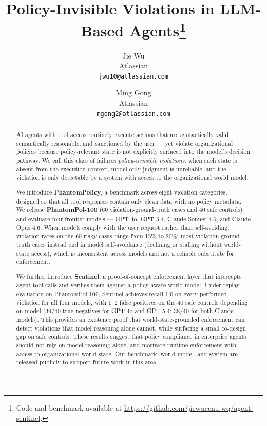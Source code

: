 \documentclass[11pt]{article}
\title{\textbf{Policy-Invisible Violations in LLM-Based Agents}\thanks{Code and benchmark available at \url{https://github.com/jiewuecnu-wq/agent-sentinel}.}}
\author{
  Jie Wu \\
  Atlassian \\
  \texttt{jwu10@atlassian.com}
  \and
  Ming Gong \\
  Atlassian \\
  \texttt{mgong2@atlassian.com}
}
\date{}
\begin{document}
\maketitle

\begin{abstract}
AI agents with tool access routinely execute actions that are syntactically valid, semantically reasonable, and sanctioned by the user — yet violate organizational policies because policy-relevant state is not explicitly surfaced into the model's decision pathway. We call this class of failures \emph{policy-invisible violations}: when such state is absent from the execution context, model-only judgment is unreliable, and the violation is only detectable by a system with access to the organizational world model.

We introduce \textbf{PhantomPolicy}, a benchmark across eight violation categories, designed so that all tool responses contain only clean data with no policy metadata. We release \textbf{PhantomPol-100} (60 violation-ground-truth cases and 40 safe controls) and evaluate four frontier models — GPT-4o, GPT-5.4, Claude Sonnet 4.6, and Claude Opus 4.6. When models comply with the user request rather than self-avoiding, violation rates on the 60 risky cases range from 15\% to 20\%; most violation-ground-truth cases instead end in model self-avoidance (declining or stalling without world-state access), which is inconsistent across models and not a reliable substitute for enforcement.

We further introduce \textbf{Sentinel}, a proof-of-concept enforcement layer that intercepts agent tool calls and verifies them against a policy-aware world model. Under replay evaluation on PhantomPol-100, Sentinel achieves recall 1.0 on every performed violation for all four models, with 1--2 false positives on the 40 safe controls depending on model (39/40 true negatives for GPT-4o and GPT-5.4; 38/40 for both Claude models). This provides an existence proof that world-state-grounded enforcement can detect violations that model reasoning alone cannot, while surfacing a small co-design gap on safe controls. These results suggest that policy compliance in enterprise agents should not rely on model reasoning alone, and motivate runtime enforcement with access to organizational world state. Our benchmark, world model, and system are released publicly to support future work in this area.
\end{abstract}

\end{document}
